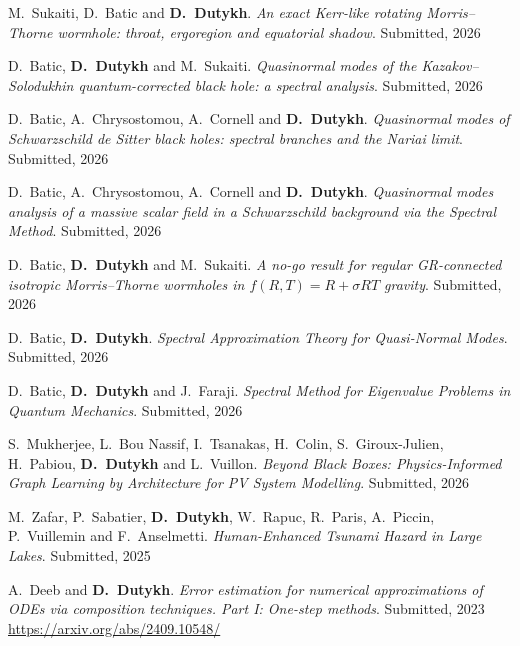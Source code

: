 \documentclass[final, a4paper, oneside, 12pt]{article}
\numberwithin{equation}{section}
\begin{document}
\begin{etaremune}

  \item M.~Sukaiti, D.~Batic and \textbf{D.~Dutykh}. \textit{An exact Kerr-like rotating Morris--Thorne wormhole: throat, ergoregion and equatorial shadow}. Submitted, 2026 %

  \item D.~Batic, \textbf{D.~Dutykh} and M.~Sukaiti. \textit{Quasinormal modes of the Kazakov--Solodukhin quantum-corrected black hole: a spectral analysis}. Submitted, 2026 %

  \item D.~Batic, A.~Chrysostomou, A.~Cornell and \textbf{D.~Dutykh}. \textit{Quasinormal modes of Schwarzschild de Sitter black holes: spectral branches and the Nariai limit}. Submitted, 2026 %

  \item D.~Batic, A.~Chrysostomou, A.~Cornell and \textbf{D.~Dutykh}. \textit{Quasinormal modes analysis of a massive scalar field in a Schwarzschild background via the Spectral Method}. Submitted, 2026 %

  \item D.~Batic, \textbf{D.~Dutykh} and M.~Sukaiti. \textit{A no-go result for regular GR-connected isotropic Morris--Thorne wormholes in $f(R, T) = R + \sigma R T$ gravity}. Submitted, 2026 %
  
  \item D.~Batic, \textbf{D.~Dutykh}. \textit{Spectral Approximation Theory for Quasi-Normal Modes}. Submitted, 2026 %

  \item D.~Batic, \textbf{D.~Dutykh} and J.~Faraji. \textit{Spectral Method for Eigenvalue Problems in Quantum Mechanics}. Submitted, 2026 %

  \item S.~Mukherjee, L.~Bou Nassif, I.~Tsanakas, H.~Colin, S.~Giroux-Julien, H.~Pabiou, \textbf{D.~Dutykh} and L.~Vuillon. \textit{Beyond Black Boxes: Physics-Informed Graph Learning by Architecture for PV System Modelling}. Submitted, 2026 %
  
  \item M.~Zafar, P.~Sabatier, \textbf{D.~Dutykh}, W.~Rapuc, R.~Paris, A.~Piccin, P.~Vuillemin and F.~Anselmetti. \textit{Human-Enhanced Tsunami Hazard in Large Lakes}. Submitted, 2025 %

  \item A.~Deeb and \textbf{D.~Dutykh}. \textit{Error estimation for numerical approximations of ODEs via composition techniques. Part I: One-step methods}. Submitted, 2023 \\ %
  \url{https://arxiv.org/abs/2409.10548/}

\end{etaremune}
\end{document}
